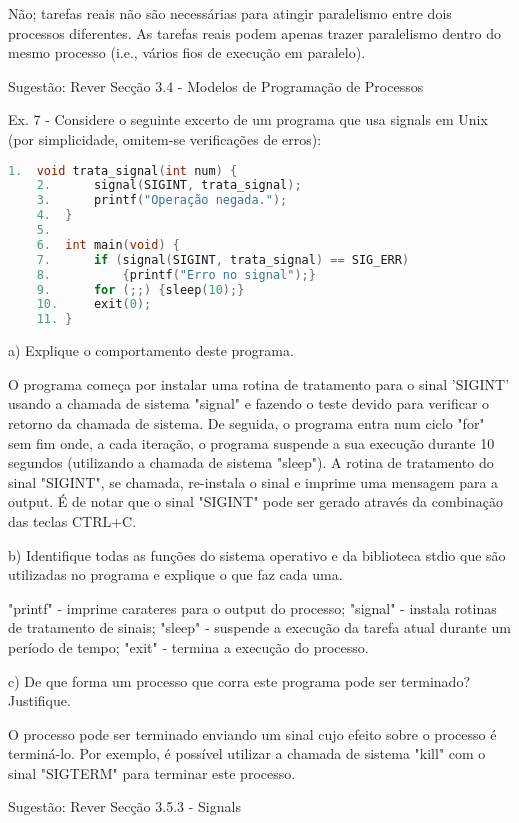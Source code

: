 \documentclass[11pt]{article}
\begin{document}
Não; tarefas reais não são necessárias para atingir paralelismo entre dois processos diferentes. As tarefas reais podem apenas trazer paralelismo dentro do mesmo processo (i.e., vários fios de execução em paralelo).

Sugestão: Rever Secção 3.4 - Modelos de Programação de Processos

Ex. 7 - Considere o seguinte excerto de um programa que usa signals em Unix (por simplicidade, omitem-se verificações de erros):

\begin{lstlisting}[language=C]
    1.  void trata_signal(int num) {
    2.      signal(SIGINT, trata_signal);
    3.      printf("Operação negada.");
    4.  }
    5.
    6.  int main(void) {
    7.      if (signal(SIGINT, trata_signal) == SIG_ERR)
    8.          {printf("Erro no signal");}
    9.      for (;;) {sleep(10);}
    10.     exit(0);
    11. }
\end{lstlisting}

a) Explique o comportamento deste programa.

O programa começa por instalar uma rotina de tratamento para o sinal 'SIGINT' usando a chamada de sistema "signal" e fazendo o teste devido para verificar o retorno da chamada de sistema. De seguida, o programa entra num ciclo "for" sem fim onde, a cada iteração, o programa suspende a sua execução durante 10 segundos (utilizando a chamada de sistema "sleep"). A rotina de tratamento do sinal "SIGINT", se chamada, re-instala o sinal e imprime uma mensagem para a output. É de notar que o sinal "SIGINT" pode ser gerado através da combinação das teclas CTRL+C.

b) Identifique todas as funções do sistema operativo e da biblioteca stdio que são utilizadas no programa e explique o que faz cada uma.

"printf" - imprime carateres para o output do processo;
"signal" - instala rotinas de tratamento de sinais;
"sleep" - suspende a execução da tarefa atual durante um período de tempo;
"exit" - termina a execução do processo.

c) De que forma um processo que corra este programa pode ser terminado? Justifique.

O processo pode ser terminado enviando um sinal cujo efeito sobre o processo é terminá-lo. Por exemplo, é possível utilizar a chamada de sistema "kill" com o sinal "SIGTERM" para terminar este processo.

Sugestão: Rever Secção 3.5.3 - Signals
\end{document}
